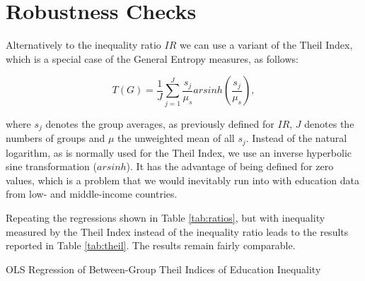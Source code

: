 \clearpage

\hypertarget{robustness-checks-with-the-theil-index}{%
\section{Robustness Checks}\label{robustness-checks-with-the-theil-index}}
\setcounter{table}{0}
\renewcommand{\thetable}{\thesection\arabic{table}}

Alternatively to the inequality ratio \(IR\) we can use a variant of the Theil Index, which is a special case of the General Entropy measures, as follows:

\[
T(G) = \frac{1}{J}\sum_{j=1}^{J}\frac{s_j}{\mu_s}arsinh(\frac{s_j}{\mu_s}),
\]

where \(s_j\) denotes the group averages, as previously defined for \(IR\), \(J\) denotes the numbers of groups and \(\mu\) the unweighted mean of all \(s_j\). Instead of the natural logarithm, as is normally used for the Theil Index, we use an inverse hyperbolic sine transformation (\(arsinh\)). It has the advantage of being defined for zero values, which is a problem that we would inevitably run into with education data from low- and middle-income countries.

Repeating the regressions shown in Table \ref{tab:ratios}, but with inequality measured by the Theil Index instead of the inequality ratio leads to the results reported in Table \ref{tab:theil}. The results remain fairly comparable.

\begin{table}

\caption{OLS Regression of Between-Group Theil Indices of Education Inequality\label{tab:theil}}
\centering

\end{table}